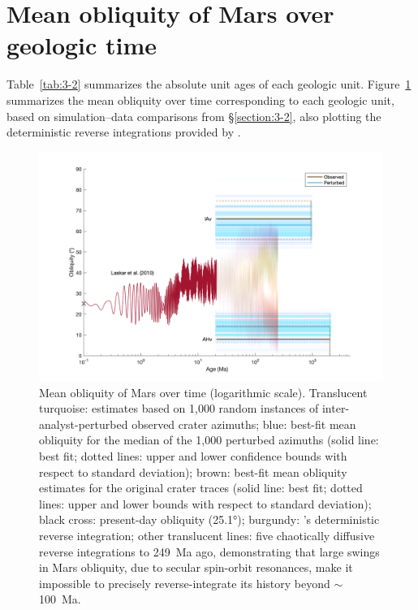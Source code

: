 \documentclass{ucetd}
\begin{document}
\section{Mean obliquity of Mars over geologic time}
\label{section:3-3}

Table~\ref{tab:3-2} summarizes the absolute unit ages of each geologic unit. Figure~\ref{fig:3-3} summarizes the mean obliquity over time corresponding to each geologic unit, based on simulation--data comparisons from §\ref{section:3-2}, also plotting the deterministic reverse integrations provided by \citet{laskar2010a}.

\begin{figure}
    \includegraphics[width=\textwidth]{figures/fig3_3.png}
    \caption[Mean obliquity of Mars over time (logarithmic scale)]{Mean obliquity of Mars over time (logarithmic scale). Translucent turquoise: estimates based on 1,000 random instances of inter-analyst-perturbed observed crater azimuths; blue: best-fit mean obliquity for the median of the 1,000 perturbed azimuths (solid line: best fit; dotted lines: upper and lower confidence bounds with respect to standard deviation); brown: best-fit mean obliquity estimates for the original crater traces (solid line: best fit; dotted lines: upper and lower bounds with respect to standard deviation); black cross: present-day obliquity (25.1°); burgundy: \citet{laskar2010a}’s deterministic reverse integration; other translucent lines: five chaotically diffusive reverse integrations to 249~Ma ago, demonstrating that large swings in Mars obliquity, due to secular spin-orbit resonances, make it impossible to precisely reverse-integrate its history beyond $\sim$100~Ma.}
    \label{fig:3-3}
\end{figure}
\end{document}
